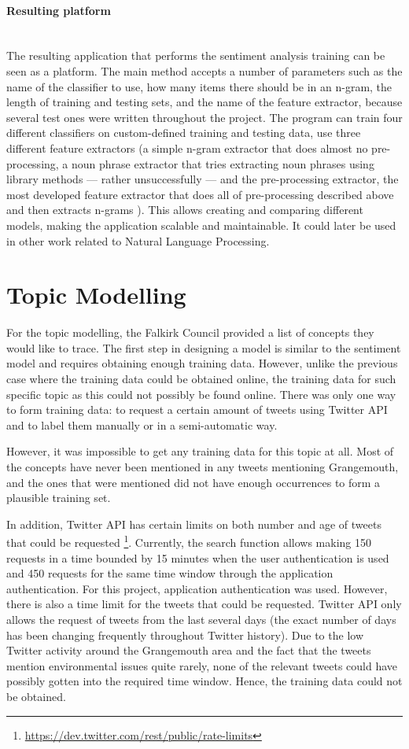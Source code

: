 \paragraph{Resulting platform}\mbox{}\\
The resulting application that performs the sentiment analysis training can be seen as a platform. The main method accepts a number of parameters such as the name of the classifier to use, how many items there should be in an n-gram, the length of training and testing sets, and the name of the feature extractor, because several test ones were written throughout the project. The program can train four different classifiers on custom-defined training and testing data, use three different feature extractors (a simple n-gram extractor that does almost no pre-processing, a noun phrase extractor that tries extracting noun phrases using library methods --- rather unsuccessfully --- and the pre-processing extractor, the most developed feature extractor that does all of pre-processing described above and then extracts n-grams ). This allows creating and comparing different models, making the application scalable and maintainable. It could later be used in other work related to Natural Language Processing.

\section{Topic Modelling}
\label{sec:tm}

For the topic modelling, the Falkirk Council provided a list of concepts they would like to trace. The first step in designing a model is similar to the sentiment model and requires obtaining enough training data. However, unlike the previous case where the training data could be obtained online, the training data for such specific topic as this could not possibly be found online. There was only one way to form training data: to request a certain amount of tweets using Twitter API and to label them manually or in a semi-automatic way. 

However, it was impossible to get any training data for this topic at all. Most of the concepts have never been mentioned in any tweets mentioning Grangemouth, and the ones that were mentioned did not have enough occurrences to form a plausible training set. 

In addition, Twitter API has certain limits on both number and age of tweets that could be requested \footnote{\url{https://dev.twitter.com/rest/public/rate-limits}}. Currently, the search function allows making 150 requests in a time bounded by 15 minutes when the user authentication is used and 450 requests for the same time window through the application authentication. For this project, application authentication was used. However, there is also a time limit for the tweets that could be requested. Twitter API only allows the request of tweets from the last several days (the exact number of days has been changing frequently throughout Twitter history). Due to the low Twitter activity around the Grangemouth area and the fact that the tweets mention environmental issues quite rarely, none of the relevant tweets could have possibly gotten into the required time window. Hence, the training data could not be obtained.

